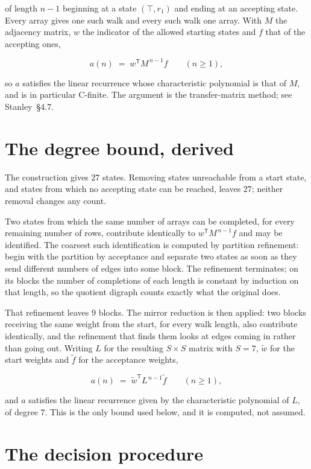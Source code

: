 \documentclass[11pt]{article}
\theoremstyle{definition}
\begin{document}
of length $n-1$ beginning at a state $(\top,r_1)$ and ending at an accepting state. Every array gives one such walk and every such walk one array. With $M$ the adjacency matrix, $w$ the indicator of the allowed starting states and $f$ that of the accepting ones,

\[a(n) \;=\; w^{\mathsf T} M^{\,n-1} f \qquad (n \ge 1),\]

so $a$ satisfies the linear recurrence whose characteristic polynomial is that of $M$, and is in particular C-finite. The argument is the transfer-matrix method; see Stanley~\S4.7.

\section{The degree bound, derived}

The construction gives $27$ states. Removing states unreachable from a start state, and states from which no accepting state can be reached, leaves $27$; neither removal changes any count.

Two states from which the same number of arrays can be completed, for every remaining number of rows, contribute identically to $w^{\mathsf T}M^{\,n-1}f$ and may be identified. The coarsest such identification is computed by partition refinement: begin with the partition by acceptance and separate two states as soon as they send different numbers of edges into some block. The refinement terminates; on its blocks the number of completions of each length is constant by induction on that length, so the quotient digraph counts exactly what the original does.

That refinement leaves $9$ blocks. The mirror reduction is then applied: two blocks receiving the same weight from the start, for every walk length, also contribute identically, and the refinement that finds them looks at edges coming in rather than going out. Writing $L$ for the resulting $S \times S$ matrix with $S = 7$, $\tilde w$ for the start weights and $\tilde f$ for the acceptance weights,

\[a(n) \;=\; \tilde w^{\mathsf T} L^{\,n-1} \tilde f \qquad (n \ge 1),\]

and $a$ satisfies the linear recurrence given by the characteristic polynomial of $L$, of degree $7$. This is the only bound used below, and it is computed, not assumed.

\section{The decision procedure}
\end{document}
